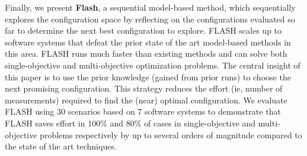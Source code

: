 Finally, we present \textbf{Flash},  a sequential model-based method, which sequentially explores the configuration space by reflecting on the configurations evaluated so far to determine the next best configuration to explore. FLASH scales up to software systems that defeat the prior state of the art model-based methods in this area. FLASH runs much faster than existing methods and can solve both single-objective and multi-objective optimization problems. The central insight of this paper is to use the prior knowledge (gained from prior runs) to choose the next promising configuration. This strategy reduces the effort (ie, number of measurements) required to find the (near) optimal configuration. We evaluate FLASH using 30 scenarios based on 7 software systems to demonstrate that FLASH saves effort in 100\% and 80\% of cases in single-objective and multi-objective problems respectively by up to several orders of magnitude compared to the state of the art techniques.



